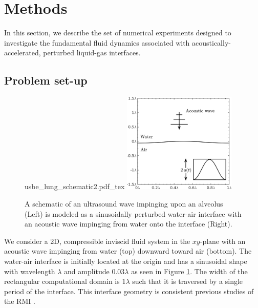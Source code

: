 \section{Methods} \label{sec:methods}%
In this section, we describe the set of numerical experiments designed
to investigate the fundamental fluid dynamics associated with
acoustically-accelerated, perturbed liquid-gas interfaces.

\subsection{Problem set-up}
\label{subsec:setup}
\begin{figure}
  \centering
  \def\svgwidth{0.48\textwidth}
  {usbe_lung_schematic2.pdf_tex} \hfill%
  \includegraphics[width=0.48\textwidth]{./figs/lung_figs/usbe_model_schematic2} \hfill
  \caption[A schematic view of the model problem]{A schematic of an
    ultrasound wave impinging upon an alveolus (Left) is modeled as a sinusoidally perturbed water-air interface with an acoustic wave impinging from water onto the interface (Right).}
  \label{fig:problem_schematic}
\end{figure}
% 
We consider a 2D, compressible inviscid fluid system in the $xy$-plane
with an acoustic wave impinging from water (top) downward toward air
(bottom). The water-air interface is initially located at the origin
and has a sinusoidal shape with wavelength $\lambda$ and amplitude
$0.03\lambda$ as seen in Figure \ref{fig:problem_schematic}. The width
of the rectangular computational domain is $1\lambda$ such that it is
traversed by a single period of the interface. This interface geometry
is consistent previous studies of the \ac{RMI}
\citep{Brouillette2002}.

